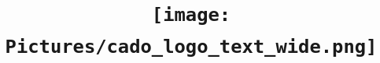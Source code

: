\documentclass[
12pt, %
a4paper, %
oneside, %
headinclude,footinclude, %
BCOR5mm, %
]{scrartcl}
\title{\texttt{[image: Pictures/cado\_logo\_text\_wide.png]} \\ \normalfont\spacedallcaps{Installation Guide} \\
\vspace*{\fill}}%
\begin{document}
\newcommand{\titlebox}[2]{
\begin{tikzpicture}
\node[draw,thick,inner sep=6mm] (titlebox) {#2};
\node[fill=white] (Title) at (titlebox.north) {\bfseries \large #1};
\end{tikzpicture}
}
\renewcommand{\sectionmark}[1]{\markright{\spacedlowsmallcaps{#1}}} %

\newcommand{\titledframe}[2]{%
       \boxput*(0,1){\psframebox*{#1}}%
         {\psframebox[framesep=12pt]{#2}}}
         
\pagestyle{scrheadings} %


\date{}
\maketitle %
\thispagestyle{empty}

\setcounter{tocdepth}{2} %
\newpage
\setcounter{page}{1}
\tableofcontents %



\end{document}
